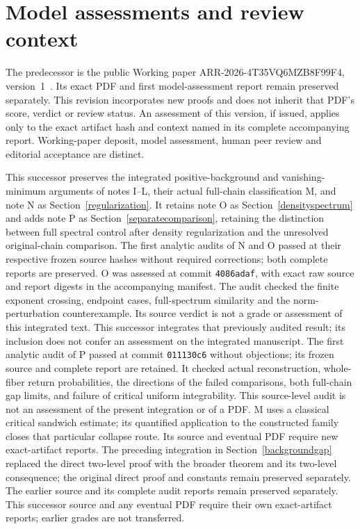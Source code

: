 \documentclass[11pt]{article}
\begin{document}
\section{Model assessments and review context}
The predecessor is the public Working paper ARR-2026-4T35VQ6MZB8F99F4, version~1~\cite{predecessor}. Its exact PDF and first model-assessment report remain preserved separately. This revision incorporates new proofs and does not inherit that PDF's score, verdict or review status. An assessment of this version, if issued, applies only to the exact artifact hash and context named in its complete accompanying report. Working-paper deposit, model assessment, human peer review and editorial acceptance are distinct.

This successor preserves the integrated positive-background and vanishing-minimum arguments of notes I--L, their actual full-chain classification M, and note N as Section~\ref{regularization}. It retains note O as Section~\ref{densityspectrum} and adds note P as Section~\ref{separatecomparison}, retaining the distinction between full spectral control after density regularization and the unresolved original-chain comparison. The first analytic audits of N and O passed at their respective frozen source hashes without required corrections; both complete reports are preserved. O was assessed at commit \texttt{4086adaf}, with exact raw source and report digests in the accompanying manifest. The audit checked the finite exponent crossing, endpoint cases, full-spectrum similarity and the norm-perturbation counterexample. Its source verdict is not a grade or assessment of this integrated text. This successor integrates that previously audited result; its inclusion does not confer an assessment on the integrated manuscript. The first analytic audit of P passed at commit \texttt{011130c6} without objections; its frozen source and complete report are retained. It checked actual reconstruction, whole-fiber return probabilities, the directions of the failed comparisons, both full-chain gap limits, and failure of critical uniform integrability. This source-level audit is not an assessment of the present integration or of a PDF. M uses a classical critical sandwich estimate; its quantified application to the constructed family closes that particular collapse route. Its source and eventual PDF require new exact-artifact reports. The preceding integration in Section~\ref{backgroundgap} replaced the direct two-level proof with the broader theorem and its two-level consequence; the original direct proof and constants remain preserved separately. The earlier source and its complete audit reports remain preserved separately. This successor source and any eventual PDF require their own exact-artifact reports; earlier grades are not transferred.
\end{document}
